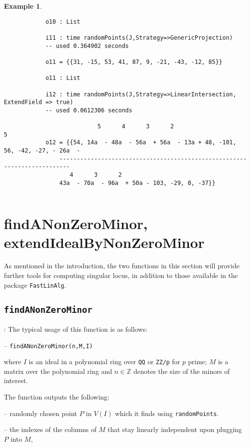 \documentclass[11pt]{amsart}
\theoremstyle{definition}
\newtheorem{example}{Example}[section]
\begin{document}
\begin{example}
{{\begin{verbatim}
			o10 : List
			
			i11 : time randomPoints(J,Strategy=>GenericProjection)
			-- used 0.364902 seconds

			o11 = {{31, -15, 53, 41, 87, 9, -21, -43, -12, 85}}

			o11 : List

			i12 : time randomPoints(J,Strategy=>LinearIntersection, ExtendField => true)
     		-- used 0.0612306 seconds

			               5      4      3      2                                      5  
			o12 = {{54, 14a  - 48a  - 56a  + 56a  - 13a + 48, -101, 56, -42, -27, - 26a  -
				-------------------------------------------------------------------------
				   4      3      2
				43a  - 70a  - 96a  + 50a - 103, -29, 0, -37}}
			
	\end{verbatim}
	}}
	\end{example}



\section{findANonZeroMinor, extendIdealByNonZeroMinor}

As mentioned in the introduction, the two functions in this section will provide further tools for computing singular locus, in addition to those available in the package {\tt FastLinAlg}. 

	\subsection{\tt findANonZeroMinor}\label{findANonZeroMinor}: The typical usage of this function is as follows: 
	
	\vspace{1em}
	-- {\tt findANonZeroMinor(n,M,I)} 
	
	\vspace{1em}
	\noindent where $I$ is an ideal
	in a polynomial ring over {\tt QQ} or {\tt ZZ/p} for $p$ prime; $M$ is a matrix
	over the polynomial ring and $n\in \mathbb{Z}$ denotes the size of the minors of interest.
	
	The function outputs the following:
	
	-- randomly chosen point $P$ in $V(I)$ which it finds using {\tt randomPoints}.
	
	-- the indexes of the columns of $M$ that stay linearly independent upon plugging $P$ into $M$, 
	
\end{document}
